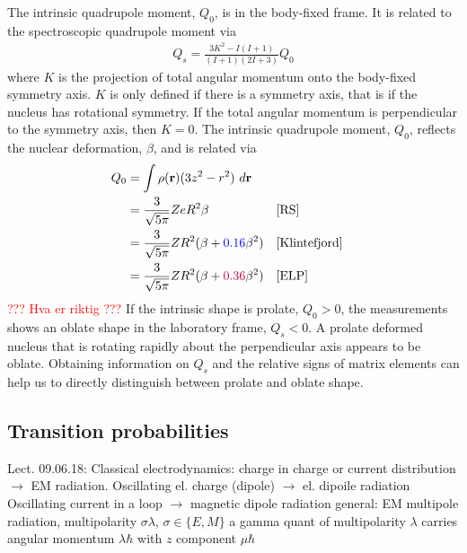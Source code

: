 \documentclass[twoside,english]{uiofysmaster/uiofysmaster}
\begin{document}
The intrinsic quadrupole moment, $Q_0$, is in the body-fixed frame.
It is related to the spectroscopic quadrupole moment via
\begin{align}
	Q_s = \frac{3K^2 - I(I+1)}{(I+1)(2I+3)} Q_0
\end{align}
where $K$ is the projection of total angular momentum onto the body-fixed symmetry axis.
$K$ is only defined if there is a symmetry axis, that is if the nucleus has rotational symmetry.
If the total angular momentum is perpendicular to the symmetry axis, then $K = 0$.
The intrinsic quadrupole moment, $Q_0$, reflects the nuclear deformation, $\beta$, and is related via \cite{Klintefjord}
\begin{align}
	Q_0 &= \int \rho(\mathbf{r}) (3z^2 - r^2) ~d \mathbf{r} \nonumber \\
	&= \frac{3}{\sqrt{5\pi}} Ze R^2 \beta &&\cite{RS} \\
	&= \frac{3}{\sqrt{5\pi}} Z R^2 (\beta + \textcolor{blue}{0.16}\beta^2) &&\cite{Klintefjord} \\
	&= \frac{3}{\sqrt{5\pi}} Z R^2 (\beta + \textcolor{purple}{0.36}\beta^2) &&\cite{ELP}
\end{align}
\textcolor{red}{??? Hva er riktig ???}\newline
If the intrinsic shape is prolate, $Q_0 > 0$, the measurements shows an oblate shape in the laboratory frame, $Q_s < 0$.
A prolate deformed nucleus that is rotating rapidly about the perpendicular axis appears to be oblate.
Obtaining information on $Q_s$ and the relative signs of matrix elements can help us to directly distinguish between prolate and oblate shape.


\subsection{Transition probabilities}


Lect. 09.06.18: \newline
Classical electrodynamics: charge in charge or current distribution $\rightarrow$ EM radiation.\newline
Oscillating el. charge (dipole) $\rightarrow$ el. dipoile radiation \newline
Oscillating current in a loop $\rightarrow$ magnetic dipole radiation \newline
general: EM multipole radiation, multipolarity $\sigma \lambda$, $\sigma \in \{ E, M \}$ \newline
a gamma quant of multipolarity $\lambda$ carries angular momentum $\lambda \hbar$ with $z$ component $\mu \hbar$
\end{document}
